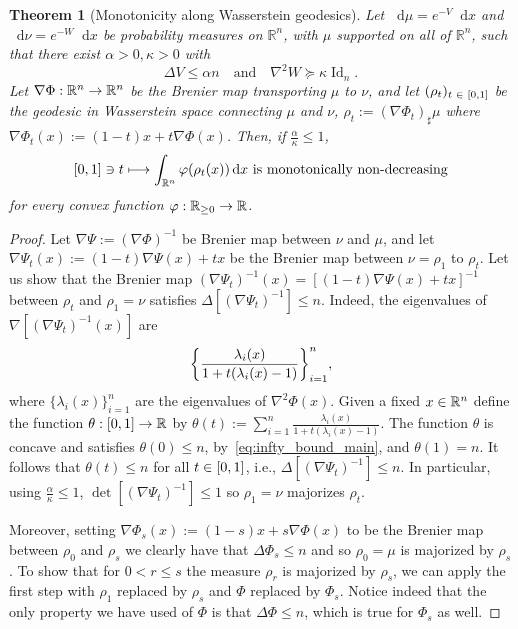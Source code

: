 \documentclass[10pt]{amsart}
\newtheorem{theo}{Theorem}[section]
\theoremstyle{definition}\newtheorem{defi}[theo]{Definition}\newtheorem{rema}[theo]{Remark}\newtheorem{exam}[theo]{Example}\newtheorem{exem}[theo]{Example}\newtheorem{nota}[theo]{Notation}
\newcommand{\R}{\mathbb R}
\DeclareMathOperator{\Id}{Id}
\newcommand{\V}{V}
\newcommand{\W}{W}
\newcommand{\dd}{n}
\newcommand{\prob}{\rho}
\newcommand{\source}{\mu}
\newcommand{\target}{\nu}
\newcommand{\lsh}{\alpha}
\newcommand{\lc}{\kappa}
\newcommand*\diff{\mathop{}\!\mathrm{d}}
\newcommand{\OT}{\Phi}
\newcommand{\cxfun}{\varphi}
\renewcommand*{\to}{\mathchoice{\longrightarrow}{\rightarrow}{\rightarrow}{\rightarrow}}
\let\oldmapsto\mapsto
\renewcommand*{\mapsto}{\mathchoice{\longmapsto}{\oldmapsto}{\oldmapsto}{\oldmapsto}}
\let\originalleft\left
\let\originalright\right
\renewcommand{\left}{\mathopen{}\mathclose\bgroup\originalleft}
\renewcommand{\right}{\aftergroup\egroup\originalright}
\let\oldin\in
\renewcommand{\in}{\mathchoice{\oldin}{\oldin}{\,\oldin\,}{\,\oldin\,}}
\newcounter{setofstep}
\newcounter{step}[setofstep]
\begin{document}
\begin{theo}[Monotonicity along Wasserstein geodesics]\label{thm:mono}
Let $\diff\source=e^{-\V}\diff x$ and $\diff\target=e^{-\W}\diff x$ be probability measures on $\R^{\dd}$, with $\source$ supported on all of $\R^{\dd}$, such that there exist $\lsh>0,\lc>0$ with
\[
\Delta \V \le \lsh\dd \quad\text{and}\quad \nabla^2\W \succeq \lc \Id_{\dd}.
\]
Let $\nabla\OT:\R^{\dd}\to\R^{\dd}$ be the Brenier map transporting $\source$ to $\target$, and let $(\prob_t)_{t\in [0,1]}$ be the geodesic in Wasserstein space connecting $\source$ and $\target$, $\prob_t:=(\nabla\OT_t)_{\sharp}\source$ where $\nabla\OT_t(x):=(1-t)x+t\nabla\OT(x)$. Then, if $\frac{\lsh}{\lc}\le 1$,
\begin{equation}\label{eq:mono_geo'}
[0,1]\ni t\mapsto \int_{\R^{\dd}}\cxfun(\prob_t(x))\diff x\textnormal{ is monotonically non-decreasing}
\end{equation}
for every convex function $\cxfun:\R_{\ge 0}\to \R$.
\end{theo}

\begin{proof}
Let $\nabla\Psi:=(\nabla\OT)^{-1}$ be Brenier map between $\target$ and $\source$, and let $\nabla\Psi_t(x):=(1-t)\nabla\Psi(x)+tx$ be the Brenier map between $\target=\prob_1$ to $\prob_t$. Let us show that the Brenier map $(\nabla\Psi_t)^{-1}(x)=[(1-t)\nabla\Psi(x)+tx]^{-1}$ between $\prob_t$ and $\prob_1=\target$ satisfies $\Delta[(\nabla\Psi_t)^{-1}]\le \dd$. Indeed, the eigenvalues of $\nabla[(\nabla\Psi_t)^{-1}(x)]$ are
\[
\left\{\frac{\lambda_i(x)}{1+t(\lambda_i(x)-1)}\right\}_{i=1}^{\dd},
\]
where $\{\lambda_i(x)\}_{i=1}^{\dd}$ are the eigenvalues of $\nabla^2\OT(x)$. Given a fixed $x\in \R^{\dd}$ define the function $\theta:[0,1]\to\R$ by $\theta(t):=\sum_{i=1}^{\dd}\frac{\lambda_i(x)}{1+t(\lambda_i(x)-1)}$. The function $\theta$ is concave and satisfies $\theta(0)\le \dd$, by~\eqref{eq:infty_bound_main}, and $\theta(1)=\dd$. It follows that $\theta(t)\le \dd$ for all $t\in [0,1]$, i.e., $\Delta[(\nabla\Psi_t)^{-1}]\le \dd$. In particular, using $\frac{\lsh}{\lc}\le 1$, $\det[(\nabla\Psi_t)^{-1}]\le 1$ so $\prob_1=\target$ majorizes $\prob_t$.

Moreover, setting \(\nabla \Phi_s(x):=(1-s)x+s \nabla \Phi(x)\) to be the Brenier map between \(\rho_{0}\) and \(\rho_{s}\) we clearly have that \(\Delta \Phi_{s}\le \dd\) and so \(\prob_0=\source\) is majorized by \(\prob_s\). To show that for \(0<r\le s\) the measure $\prob_{r}$ is majorized by \(\prob_s\), we can apply the first step with \(\prob_{1}\) replaced by \(\prob_{s}\) and \(\Phi\) replaced by \(\Phi_{s}\). Notice indeed that the only property we have used of \(\Phi\) is that \(\Delta \Phi \le \dd\), which is true for \(\Phi_{s}\) as well.
\end{proof}
\end{document}
